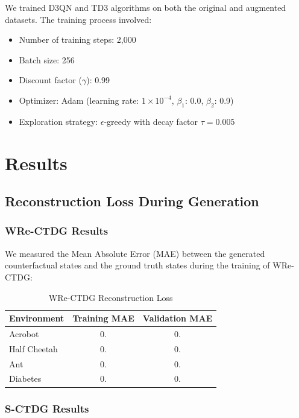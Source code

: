 We trained D3QN and TD3 algorithms on both the original and augmented datasets.
The training process involved:

\begin{itemize}
    \item Number of training steps: 2,000
    \item Batch size: 256
    \item Discount factor ($\gamma$): 0.99
    \item Optimizer: Adam (learning rate: $1\times 10^{-4}$, $\beta_1$: 0.0, $\beta_2$: 0.9)
    \item Exploration strategy: $\epsilon$-greedy with decay factor $\tau = 0.005$
\end{itemize}

\section{Results}

\subsection{Reconstruction Loss During Generation}

\subsubsection{WRe-CTDG Results}

We measured the Mean Absolute Error (MAE)
between the generated counterfactual states and the ground truth
states during the training of WRe-CTDG:

\begin{table}[h]
\centering
\begin{tabular}{|l|c|c|}
\hline
Environment & Training MAE & Validation MAE \\
\hline
Acrobot & 0. & 0. \\
Half Cheetah & 0. & 0. \\
Ant & 0. & 0. \\
Diabetes & 0. & 0. \\
\hline
\end{tabular}
\caption{WRe-CTDG Reconstruction Loss}
\label{tab:wre_ctdg_loss}
\end{table}

\subsubsection{S-CTDG Results}

